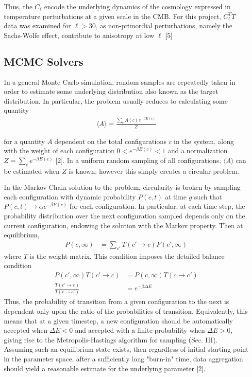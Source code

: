 \documentclass[aps,prd,final,twocolumn]{revtex4}
\begin{document}
Thus, the $C_{\ell}$ encode the underlying dynamics of the cosmology expressed in temperature perturbations at a given scale in the CMB. For this project, $C_\ell^TT$ data was examined for $\ell>30$, as non-primordial perturbations, namely the Sachs-Wolfe effect, contribute to anisotropy at low $\ell$ [5]

\subsection{MCMC Solvers}
In a general Monte Carlo simulation, random samples are repeatedly taken in order to estimate some underlying distribution also known as the target distribution. In particular, the problem usually reduces to calculating some quantity
\begin{align}
\langle A\rangle = \frac{\sum_c A(c) e^{-\beta E(c)}}{Z}\label{lon8}
\end{align}

for a quantity $A$ dependent on the total configurations $c$ in the system, along with the weight of each configuration $0<e^{-\beta E(c)}<1$ and a normalization $Z=\sum_c e^{-\beta E(c)}$ [2]. In a uniform random sampling of all configurations, $\langle A\rangle$ can be estimated when $Z$ is known; however this simply creates a circular problem. 

In the Markov Chain solution to the problem, circularity is broken by sampling each configuration with dynamic probability $P(c,t)$ at time $g$ such that $P(c,t)\rightarrow \alpha e^{-\beta E(c)}$ for each configuration. In particular, at each time step, the probability distribution over the next configuration sampled depends only on the current configuration, endowing the solution with the Markov property. Then at equilibrium,
\begin{align}
P(c,\infty) &= \sum_{c'}T(c'\rightarrow c)P(c',\infty)\label{lon9}
\end{align}
where $T$ is the weight matrix. This condition imposes the detailed balance condition
\begin{align}
P(c',\infty) T(c'\rightarrow c) &= P(c,\infty)T(c\rightarrow c')\label{lon10}\\
\frac{T(c'\rightarrow c)}{T(c\rightarrow c')}&=e^{-\beta\Delta E}\label{lon11}
\end{align}
Thus, the probability of transition from a given configuration to the next is dependent only upon the ratio of the probabilities of transition. Equivalently, this means that at a given timestep, a new configuration should be automatically accepted when $\Delta E<0$ and accepted with a finite probability when $\Delta E>0$, giving rise to the Metropolis-Hastings algorithm for sampling (Sec. III). Assuming such an equilibrium state exists, then regardless of initial starting point in the parameter space, after a sufficiently long "burn-in" time, data aggregation should yield a reasonable estimate for the underlying parameter [2].
\end{document}
